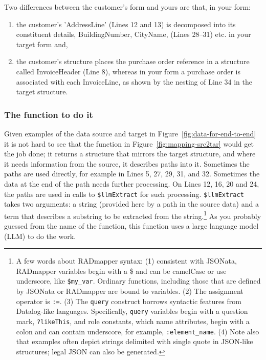 \documentclass[10pt,letterpaper]{article} %
\newcommand{\stt}[1]{\texttt{#1}} %
\begin{document}
Two differences between the customer's form and yours are that, in your form:
\begin{enumerate}
\item{the customer's 'AddressLine' (Lines 12 and 13) is decomposed into its constituent details, BuildingNumber, CityName, (Lines 28--31) etc. in your target form and,}
\item{the customer's structure places the purchase order reference in a structure called InvoiceHeader (Line 8), whereas in your form a purchase order is associated with
each InvoiceLine, as shown by the nesting of Line 34 in the target structure.}
\end{enumerate}

\subsubsection{The function to do it}

Given examples of the data source and target in Figure~\ref{fig:data-for-end-to-end} it is not hard to see that the function in Figure~\ref{fig:mapping-src2tar} would get the job done;
it returns a structure that mirrors the target structure, and where it needs information from the source, it  describes paths into it.
Sometimes the paths are used directly, for example in Lines 5, 27, 29, 31, and 32.
Sometimes the data at the end of the path needs further processing.
On Lines 12, 16, 20 and 24, the paths are used in calls to  \stt{\$llmExtract} for such processing.
\stt{\$llmExtract} takes two arguments: a string (provided here by a path in the source data) and a term that describes a substring to be extracted from the string.\footnote{A few words about RADmapper syntax: (1) consistent with JSONata, RADmapper variables begin with a \$ and can be camelCase or use underscore, like \stt{\$my\_var}.
  Ordinary functions, including those that are defined by JSONata or RADmapper are bound to variables.
  (2) The assignment operator is \stt{:=}.
  (3) The \stt{query} construct borrows syntactic features from Datalog-like languages.
  Specifically, \stt{query} variables begin with a question mark, \stt{?likeThis}, and role constants,
  which name attributes, begin with a colon and can contain underscore, for example, \stt{:element\_name}.
  (4) Note also that examples often depict strings delimited with single quote in JSON-like structures; legal JSON can also be generated.}
As you probably guessed from the name of the function, this function uses a large language model (LLM) to do the work.
\end{document}
